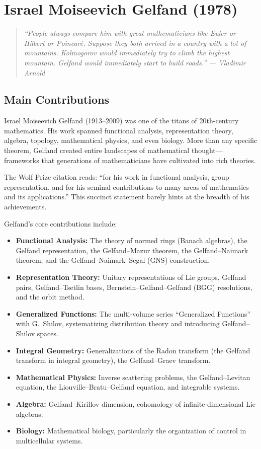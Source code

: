 \chapter{Israel Moiseevich Gelfand (1978)}

\begin{quote}
\it ``People always compare him with great mathematicians like Euler or Hilbert or Poincar\'{e}. Suppose they both arrived in a country with a lot of mountains. Kolmogorov would immediately try to climb the highest mountain. Gelfand would immediately start to build roads.'' --- Vladimir Arnold
\end{quote}

\section{Main Contributions}

Israel Moiseevich Gelfand (1913--2009) was one of the titans of 20th-century mathematics. His work spanned functional analysis, representation theory, algebra, topology, mathematical physics, and even biology. More than any specific theorem, Gelfand created entire landscapes of mathematical thought---frameworks that generations of mathematicians have cultivated into rich theories.

The Wolf Prize citation reads: ``for his work in functional analysis, group representation, and for his seminal contributions to many areas of mathematics and its applications.'' This succinct statement barely hints at the breadth of his achievements.

Gelfand's core contributions include:
\begin{itemize}
    \item \textbf{Functional Analysis:} The theory of normed rings (Banach algebras), the Gelfand representation, the Gelfand--Mazur theorem, the Gelfand--Naimark theorem, and the Gelfand--Naimark--Segal (GNS) construction.
    \item \textbf{Representation Theory:} Unitary representations of Lie groups, Gelfand pairs, Gelfand--Tsetlin bases, Bernstein--Gelfand--Gelfand (BGG) resolutions, and the orbit method.
    \item \textbf{Generalized Functions:} The multi-volume series ``Generalized Functions'' with G.\ Shilov, systematizing distribution theory and introducing Gelfand--Shilov spaces.
    \item \textbf{Integral Geometry:} Generalizations of the Radon transform (the Gelfand transform in integral geometry), the Gelfand--Graev transform.
    \item \textbf{Mathematical Physics:} Inverse scattering problems, the Gelfand--Levitan equation, the Liouville--Bratu--Gelfand equation, and integrable systems.
    \item \textbf{Algebra:} Gelfand--Kirillov dimension, cohomology of infinite-dimensional Lie algebras.
    \item \textbf{Biology:} Mathematical biology, particularly the organization of control in multicellular systems.
\end{itemize}

